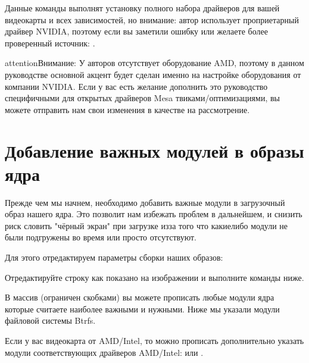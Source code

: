 \documentclass[letterpaper,10pt,russian,openany]{sphinxmanual}
\begin{document}
\sphinxAtStartPar
Данные команды выполнят установку полного набора драйверов для вашей видеокарты и всех зависимостей,
но внимание: автор использует проприетарный драйвер NVIDIA, поэтому если вы заметили ошибку или желаете более проверенный источник: .

\begin{sphinxadmonition}{attention}{Внимание:}
\sphinxAtStartPar
У авторов отсутствует оборудование AMD, поэтому в данном руководстве основной акцент будет сделан именно на настройке оборудования от компании NVIDIA.
Если у вас есть желание дополнить это руководство специфичными для открытых драйверов Mesa твиками/оптимизациями,
вы можете отправить нам свои изменения в качестве  на рассмотрение.
\end{sphinxadmonition}

\ignorespaces 

\section{Добавление важных модулей в образы ядра}
\label{\detokenize{source/first-steps:important-modules}}\label{\detokenize{source/first-steps:index-6}}\label{\detokenize{source/first-steps:id6}}
\sphinxAtStartPar
Прежде чем мы начнем, необходимо добавить важные модули в загрузочный образ
нашего ядра.
Это позволит нам избежать проблем в дальнейшем, и снизить риск словить
"чёрный экран" при загрузке из\sphinxhyphen{}за того что какие\sphinxhyphen{}либо модули не были подгружены во время или просто отсутствуют.

\sphinxAtStartPar
Для этого отредактируем параметры сборки наших образов: 

\sphinxAtStartPar
Отредактируйте строку  как показано на изображении и выполните команды ниже.

\sphinxAtStartPar
В массив (ограничен скобками) вы можете прописать любые модули ядра которые считаете наиболее важными и нужными.
Ниже мы указали модули файловой системы Btrfs.

\sphinxAtStartPar
Если у вас видеокарта от AMD/Intel, то можно прописать дополнительно указать модули соответствующих драйверов AMD/Intel:
 или .
\end{document}
